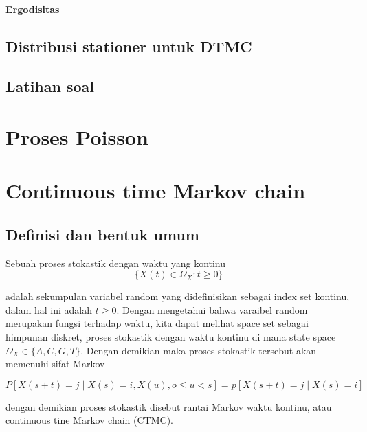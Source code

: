 \documentclass[11pt,b5paper,twoside]{book}
\begin{document}
		\subsubsection{Ergodisitas}
	
	
	\section{Distribusi stationer untuk DTMC} %
	
	\section*{Latihan soal} %
	
\chapter{Proses Poisson}	



\chapter{Continuous time Markov chain}	

	\section{Definisi dan bentuk umum} %
	
	\noindent Sebuah proses stokastik dengan waktu yang kontinu
	\[
	\big\{ X(t) \in \Omega_X : t \geq 0 \big\}
	\]
	
	adalah sekumpulan variabel random yang didefinisikan sebagai index set kontinu, dalam hal ini adalah $t \geq 0$. Dengan mengetahui bahwa varaibel random merupakan fungsi terhadap waktu, kita dapat melihat space set sebagai himpunan diskret, proses stokastik dengan waktu kontinu di mana state space $\Omega_X \in \{A, C, G, T\}$.  Dengan demikian maka proses stokastik tersebut akan memenuhi sifat Markov
	
	\[
	P[X(s+t) = j \mid X(s) = i, X(u), o \leq u < s] = p[X(s+t)=j \mid X(s) = i]
	\]
	
	dengan demikian proses stokastik disebut rantai Markov waktu kontinu, atau continuous tine Markov chain (CTMC).
	
\end{document}
